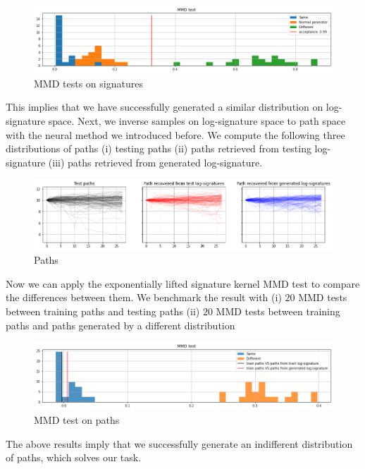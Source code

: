 \documentclass[12pt]{report}
\theoremstyle{definition}
\theoremstyle{remark}
\begin{document}
 \begin{figure}[H]
    \centering
    \includegraphics[width=\textwidth]{figs/cvae10.png}
    \caption{MMD tests on signatures}
\end{figure}
This implies that we have successfully generated a similar distribution on log-signature space. Next, we inverse samples on log-signature space to path space with the neural method we introduced before. We compute the following three distributions of paths (i) testing paths (ii) paths retrieved from testing log-signature (iii) paths retrieved from generated log-signature.
 \begin{figure}[H]
    \centering
    \includegraphics[width=\textwidth]{figs/cvae13.png}
    \caption{Paths}
\end{figure}
Now we can apply the exponentially lifted signature kernel MMD test to compare the differences between them. We benchmark the result with (i) $20$ MMD tests between training paths and testing paths (ii) $20$ MMD tests between training paths and paths generated by a different distribution
 \begin{figure}[H]
    \centering
    \includegraphics[width=\textwidth]{figs/cvae14.png}
    \caption{MMD test on paths}
\end{figure}
The above results imply that we successfully generate an indifferent distribution of paths, which solves our task. 
\end{document}

